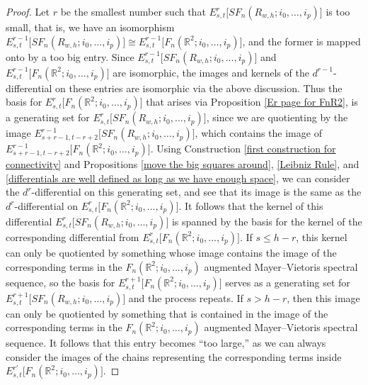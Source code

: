 \documentclass[pagebackref,colorlinks,citecolor=blue,linkcolor=blue,urlcolor=blue,filecolor=blue]{article}
\theoremstyle{definition}\newtheorem{definition}[thm]{Definition}
\theoremstyle{definition}
\newcommand{\R}{\ensuremath{\mathbb{R}}}
\begin{document}
\begin{proof}
Let $r$ be the smallest number such that $E^{r}_{s, t}\big[SF_{n}(R_{w,h}; i_{0}, \dots, i_{p})\big]$ is too small, that is, we have an isomorphism $E^{r-1}_{s, t}\big[SF_{n}(R_{w,h}; i_{0}, \dots, i_{p})\big]\cong E^{r-1}_{s, t}\big[F_{n}(\R^{2}; i_{0}, \dots, i_{p})\big]$, and the former is mapped onto by a too big entry.
Since $E^{r-1}_{s, t}\big[SF_{n}(R_{w,h}; i_{0}, \dots, i_{p})\big]$ and $E^{r-1}_{s, t}\big[F_{n}(\R^{2}; i_{0}, \dots, i_{p})\big]$ are isomorphic, the images and kernels of the $d^{r-1}$-differential on these entries are isomorphic via the above discussion.
Thus the basis for $E^{r}_{s, t}\big[F_{n}(\R^{2}; i_{0}, \dots, i_{p})\big]$ that arises via Proposition \ref{Er page for FnR2}, is a generating set for $E^{r}_{s, t}\big[SF_{n}(R_{w,h}; i_{0}, \dots, i_{p})\big]$, since we are quotienting by the image $E^{r-1}_{s+r-1, t-r+2}\big[SF_{n}(R_{w,h}; i_{0}, \dots, i_{p})\big]$, which contains the image of $E^{r-1}_{s+r-1, t-r+2}\big[F_{n}(\R^{2}; i_{0}, \dots, i_{p})\big]$.
Using Construction \ref{first construction for connectivity} and Propositions \ref{move the big squares around}, \ref{Leibniz Rule}, and \ref{differentials are well defined as long as we have enough space}, we can consider the $d^{r}$-differential on this generating set, and see that its image is the same as the $d^{r}$-differential on $E^{r}_{s, t}\big[F_{n}(\R^{2}; i_{0}, \dots, i_{p})\big]$.
It follows that the kernel of this differential $E^{r}_{s, t}\big[SF_{n}(R_{w,h}; i_{0}, \dots, i_{p})\big]$ is spanned by the basis for the kernel of the corresponding differential from $E^{r}_{s, t}\big[F_{n}(\R^{2}; i_{0}, \dots, i_{p})\big]$.
If $s\le h-r$, this kernel can only be quotiented by something whose image contains the image of the corresponding terms in the $F_{n}(\R^{2}; i_{0}, \dots, i_{p})$ augmented Mayer--Vietoris spectral sequence, so the basis for $E^{r+1}_{s, t}\big[F_{n}(\R^{2}; i_{0}, \dots, i_{p})\big]$ serves as a generating set for $E^{r+1}_{s, t}\big[SF_{n}(R_{w,h}; i_{0}, \dots, i_{p})\big]$ and the process repeats.
If $s> h-r$, then this image can only be quotiented by something that is contained in the image of the corresponding terms in the $F_{n}(\R^{2}; i_{0}, \dots, i_{p})$ augmented Mayer--Vietoris spectral sequence.
It follows that this entry becomes ``too large,'' as we can always consider the images of the chains representing the corresponding terms inside $E^{r'}_{s,t}\big[F_{n}(\R^{2}; i_{0}, \dots, i_{p})\big]$.


\end{proof}
\end{document}
